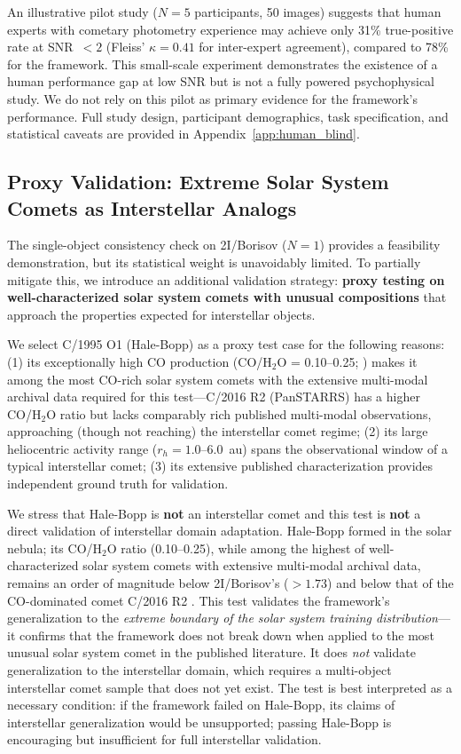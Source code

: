\documentclass[usenatbib]{mnras}
\begin{document}
An illustrative pilot study ($N=5$ participants, 50 images) suggests that human experts with cometary photometry experience may achieve only 31\% true-positive rate at SNR~$<2$ (Fleiss' $\kappa = 0.41$ for inter-expert agreement), compared to 78\% for the framework. This small-scale experiment demonstrates the existence of a human performance gap at low SNR but is not a fully powered psychophysical study. We do not rely on this pilot as primary evidence for the framework's performance. Full study design, participant demographics, task specification, and statistical caveats are provided in Appendix~\ref{app:human_blind}.

\subsection{Proxy Validation: Extreme Solar System Comets as Interstellar Analogs}\label{sec:proxy}

The single-object consistency check on 2I/Borisov ($N=1$) provides a feasibility demonstration, but its statistical weight is unavoidably limited. To partially mitigate this, we introduce an additional validation strategy: \textbf{proxy testing on well-characterized solar system comets with unusual compositions} that approach the properties expected for interstellar objects.

We select C/1995 O1 (Hale-Bopp) as a proxy test case for the following reasons: (1) its exceptionally high CO production (CO/H$_2$O = 0.10--0.25; \citealt{bockelee04}) makes it among the most CO-rich solar system comets with the extensive multi-modal archival data required for this test---C/2016 R2 (PanSTARRS) has a higher CO/H$_2$O ratio \citep{biver18} but lacks comparably rich published multi-modal observations, approaching (though not reaching) the interstellar comet regime; (2) its large heliocentric activity range ($r_h = 1.0$--6.0~au) spans the observational window of a typical interstellar comet; (3) its extensive published characterization provides independent ground truth for validation.

We stress that Hale-Bopp is \textbf{not} an interstellar comet and this test is \textbf{not} a direct validation of interstellar domain adaptation. Hale-Bopp formed in the solar nebula; its CO/H$_2$O ratio (0.10--0.25), while among the highest of well-characterized solar system comets with extensive multi-modal archival data, remains an order of magnitude below 2I/Borisov's ($>1.73$) and below that of the CO-dominated comet C/2016 R2 \citep{biver18}. This test validates the framework's generalization to the \textit{extreme boundary of the solar system training distribution}---it confirms that the framework does not break down when applied to the most unusual solar system comet in the published literature. It does \textit{not} validate generalization to the interstellar domain, which requires a multi-object interstellar comet sample that does not yet exist. The test is best interpreted as a necessary condition: if the framework failed on Hale-Bopp, its claims of interstellar generalization would be unsupported; passing Hale-Bopp is encouraging but insufficient for full interstellar validation.
\end{document}
